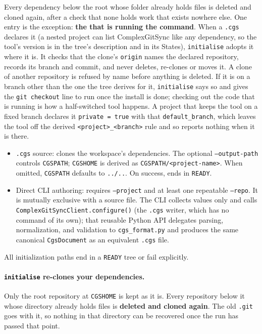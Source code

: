 Every dependency below the root whose folder already holds files is deleted and
cloned again, after a check that none holds work that exists nowhere else. One
entry is the exception: \textbf{the \cgscli{} that is running the command}.
When a \texttt{.cgs} declares it (a nested project can list ComplexGitSync like
any dependency, so the tool's version is in the tree's description and in its
States), \texttt{initialise} adopts it where it is. It checks that the clone's
\texttt{origin} names the declared repository, records its branch and commit, and
never deletes, re-clones or moves it. A clone of another repository is refused by
name before anything is deleted. If it is on a branch other than the one the tree
derives for it, \texttt{initialise} says so and gives the \texttt{git checkout}
line to run once the install is done; checking out the code that is running is how
a half-switched tool happens. A project that keeps the tool on a fixed branch declares it
\texttt{private = true} with that \texttt{default\_branch}, which leaves the tool off the
derived \texttt{<project>\_<branch>} rule and so reports nothing when it is there.

\begin{itemize}
  \item \texttt{.cgs} source: clones the workspace's dependencies.
    The optional \texttt{--output-path} controls
    \texttt{CGSPATH}; \texttt{CGSHOME} is derived as
    \texttt{CGSPATH/<project-name>}. When omitted, \texttt{CGSPATH} defaults to
    \texttt{../..}.  On success, ends in \texttt{READY}.
  \item Direct CLI authoring: requires \texttt{--project} and at least one
    repeatable \texttt{--repo}. It is mutually exclusive with a source file.
    The CLI collects values only and calls
    \texttt{ComplexGitSyncClient.configure()} (the \texttt{.cgs} writer, which
    has no command of its own); that reusable Python API
    delegates parsing, normalization, and validation to \texttt{cgs\_format.py}
    and produces the same canonical \texttt{CgsDocument} as an equivalent
    \texttt{.cgs} file.
\end{itemize}

All initialization paths end in a \texttt{READY} tree or fail explicitly.

\paragraph{\texttt{initialise} re-clones your dependencies.} Only the root
repository at \texttt{CGSHOME} is kept as it is. Every repository below it
whose directory already holds files is \textbf{deleted and cloned again}. The
old \texttt{.git} goes with it, so nothing in that directory can be recovered
once the run has passed that point.

